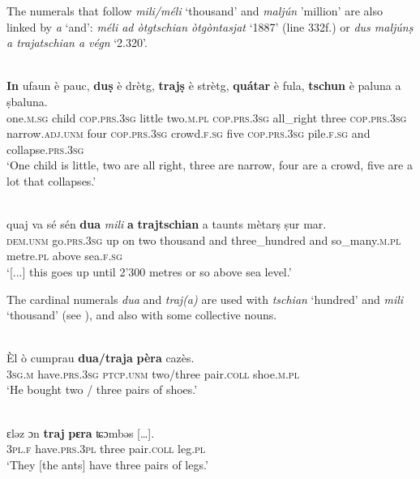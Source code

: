 The numerals that follow \textit{mili/méli} `thousand' and \textit{maljún} 'million' are also linked by \textit{a} `and': \textit{méli ad òtgtschian òtgòntasjat} `1887' (line 332f.) or \textit{dus maljúnṣ a trajatschian a végn} `2.320'.

\ea
\label{}
\\
\gll  \textbf{In} ufaun è pauc, \textbf{duṣ} è drètg, \textbf{trajṣ} è strètg, \textbf{quátar} è fula, \textbf{tschun} è paluna a ṣbaluna.\\
one.\textsc{m.sg} child \textsc{cop.prs.3sg} little two.\textsc{m.pl} \textsc{cop.prs.3sg} all\_right three \textsc{cop.prs.3sg} narrow.\textsc{adj.unm} four \textsc{cop.prs.3sg} crowd.\textsc{f.sg} five \textsc{cop.prs.3sg} pile.\textsc{f.sg} and  collapse.\textsc{prs.3sg}\\
\glt `One child is little, two are all right, three are narrow, four are a crowd, five are a lot that collapses.'
\z

\ea\label{}
\\
\gll  [...] quaj va\footnotemark{} sé sén \textbf{dua} \textit{mili} \textbf{a} \textbf{trajtschian} a taunts mètarṣ ṣur mar. \\
{} \textsc{dem.unm} go.\textsc{prs.3sg} up on two thousand and three\_hundred and  so\_many.\textsc{m.pl} metre.\textsc{pl} above sea.\textsc{f.sg}\\
\glt `[...] this goes up until 2'300 metres or so above sea level.'
\z

The cardinal numerals \textit{dua} and  \textit{traj(a)} are used with \textit{tschian} `hundred' and \textit{mili} `thousand' (see ), and also with some collective nouns.

\ea
\label{}
\\
\gll Èl ò cumprau \textbf{dua/traja} \textbf{pèra} cazès.\\
\textsc{3sg.m} have.\textsc{prs.3sg} \textsc{ptcp.unm} two/three pair.\textsc{coll} shoe.\textsc{m.pl}\\
\glt `He bought two / three pairs of shoes.'
\z

\ea
\label{}
\\
\gll    ɛləz ɔn \textbf{traj} \textbf{pɛra} ʨɔmbəs […].\\
    \textsc{3pl.f} have.\textsc{prs.3pl} three pair.\textsc{coll} leg.\textsc{pl}\\
\glt `They [the ants] have three pairs of legs.'
\z

